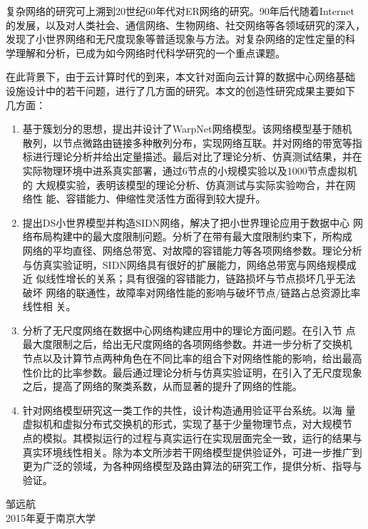 \documentclass[master]{njuthesis}
\begin{document}
\begin{preface}
复杂网络的研究可上溯到20世纪60年代对ER网络的研究。90年后代随着Internet
的发展，以及对人类社会、通信网络、生物网络、社交网络等各领域研究的深入，
发现了小世界网络和无尺度现象等普适现象与方法。对复杂网络的定性定量的科
学理解和分析，已成为如今网络时代科学研究的一个重点课题。

在此背景下，由于云计算时代的到来，本文针对面向云计算的数据中心网络基础
设施设计中的若干问题，进行了几方面的研究。本文的创造性研究成果主要如下
几方面：

\begin{enumerate}
\item 基于簇划分的思想，提出并设计了WarpNet网络模型。该网络模型基于随机
  散列，以节点微路由链接多种散列分布，实现网络互联。并对网络的带宽等指
  标进行理论分析并给出定量描述。最后对比了理论分析、仿真测试结果，并在
  实际物理环境中进系真实部署，通过6节点的小规模实验以及1000节点虚拟机的
  大规模实验，表明该模型的理论分析、仿真测试与实际实验吻合，并在网络性
  能、容错能力、伸缩性灵活性方面得到较大提升。
\item 提出DS小世界模型并构造SIDN网络，解决了把小世界理论应用于数据中心
  网络布局构建中的最大度限制问题。分析了在带有最大度限制约束下，所构成
  网络的平均直径、网络总带宽、对故障的容错能力等各项网络参数。理论分析
  与仿真实验证明，SIDN网络具有很好的扩展能力，网络总带宽与网络规模成近
  似线性增长的关系；具有很强的容错能力，链路损坏与节点损坏几乎无法破坏
  网络的联通性，故障率对网络性能的影响与破坏节点/链路占总资源比率线性相
  关。
\item 分析了无尺度网络在数据中心网络构建应用中的理论方面问题。在引入节
  点最大度限制之后，给出无尺度网络的各项网络参数。并进一步分析了交换机
  节点以及计算节点两种角色在不同比率的组合下对网络性能的影响，给出最高
  性价比的比率参数。最后通过理论分析与仿真实验证明，在引入了无尺度现象
  之后，提高了网络的聚类系数，从而显著的提升了网络的性能。

\item 针对网络模型研究这一类工作的共性，设计构造通用验证平台系统。以海
  量虚拟机和虚拟分布式交换机的形式，实现了基于少量物理节点，对大规模节
  点的模拟。其模拟运行的过程与真实运行在实现层面完全一致，运行的结果与
  真实环境线性相关。除为本文所涉若干网络模型提供验证外，可进一步推广到
  更为广泛的领域，为各种网络模型及路由算法的研究工作，提供分析、指导与
  验证。
\end{enumerate}

\vspace{1cm}
\begin{flushright}
邹远航\\
2015年夏于南京大学
\end{flushright}

\end{preface}
\end{document}
